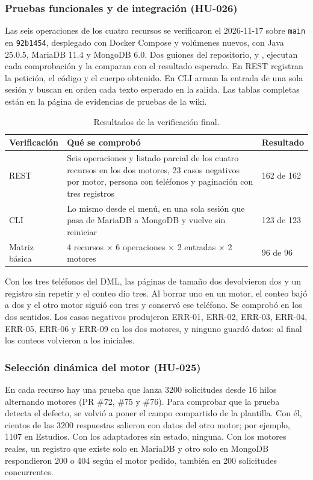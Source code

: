 \documentclass[11pt,a4paper]{article}
\begin{document}
\subsubsection*{Pruebas funcionales y de integración (HU-026)}
Las seis operaciones de los cuatro recursos se verificaron el 2026-11-17 sobre
\texttt{main} en \texttt{92b1454}, desplegado con Docker Compose y volúmenes
nuevos, con Java 25.0.5, MariaDB 11.4 y MongoDB 6.0. Dos guiones del repositorio,
 y , ejecutan cada
comprobación y la comparan con el resultado esperado. En REST registran
la petición, el código y el cuerpo obtenido. En CLI arman la entrada de una sola
sesión y buscan en orden cada texto esperado en la salida. Las tablas completas
están en la página de evidencias de pruebas de la wiki.

\begin{table}[H]
\centering\small
\begin{tabularx}{\textwidth}{@{}p{3.3cm}X p{2.4cm}@{}}
\toprule
\textbf{Verificación}&\textbf{Qué se comprobó}&\textbf{Resultado}\\\midrule
REST&Seis operaciones y listado parcial de los cuatro recursos en los dos motores, 23 casos negativos por motor, persona con teléfonos y paginación con tres registros&162 de 162\\
CLI&Lo mismo desde el menú, en una sola sesión que pasa de MariaDB a MongoDB y vuelve sin reiniciar&123 de 123\\
Matriz básica&4 recursos \(\times\) 6 operaciones \(\times\) 2 entradas \(\times\) 2 motores&96 de 96\\
\bottomrule
\end{tabularx}
\caption{Resultados de la verificación final.}
\end{table}

Con los tres teléfonos del DML, las páginas de tamaño dos devolvieron dos y un
registro sin repetir y el conteo dio tres. Al borrar uno en un motor, el conteo
bajó a dos y el otro motor siguió con tres y conservó ese teléfono. Se comprobó
en los dos sentidos. Los casos negativos produjeron ERR-01, ERR-02, ERR-03,
ERR-04, ERR-05, ERR-06 y ERR-09 en los dos motores, y ninguno guardó datos: al
final los conteos volvieron a los iniciales.

\subsubsection*{Selección dinámica del motor (HU-025)}
En cada recurso hay una prueba que lanza 3200 solicitudes desde 16 hilos
alternando motores (PR \#72, \#75 y \#76). Para comprobar que la prueba detecta
el defecto, se volvió a poner el campo compartido de la plantilla. Con él,
cientos de las 3200 respuestas salieron con datos del otro motor; por ejemplo,
1107 en Estudios. Con los adaptadores sin estado, ninguna. Con los motores reales, un registro que existe
solo en MariaDB y otro solo en MongoDB respondieron 200 o 404 según el motor
pedido, también en 200 solicitudes concurrentes.
\end{document}
